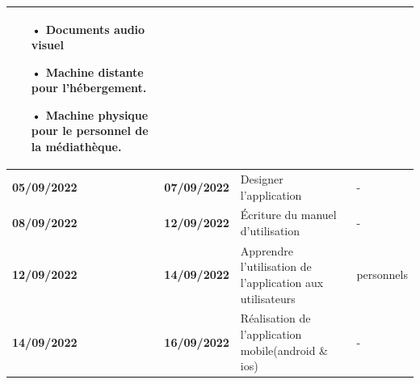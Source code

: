 \documentclass[12pt,a4paper]{article}
\begin{document}
\begin{center}
\begin{tabular}{|p{2.2cm}|p{2.2cm}|p{6.5cm}|p{6.5cm}|}
\begin{itemize}
\item[•] Documents audio visuel
\item[•] Machine distante pour l'hébergement.
\item[•] Machine physique pour le personnel de la médiathèque.
\end{itemize} \\
\hline 
\textbf{05/09/2022} & \textbf{07/09/2022} & Designer l'application & - \\
\hline 
\textbf{08/09/2022} & \textbf{12/09/2022} & Écriture du manuel d'utilisation & - \\ 
\hline
\textbf{12/09/2022} & \textbf{14/09/2022} & Apprendre l'utilisation de l'application aux utilisateurs & personnels\\ 
\hline  
\textbf{14/09/2022} & \textbf{16/09/2022} & Réalisation de l'application mobile(android \& ios) & -\\ 
\hline 
\end{tabular} 
\end{center}
\end{document}

